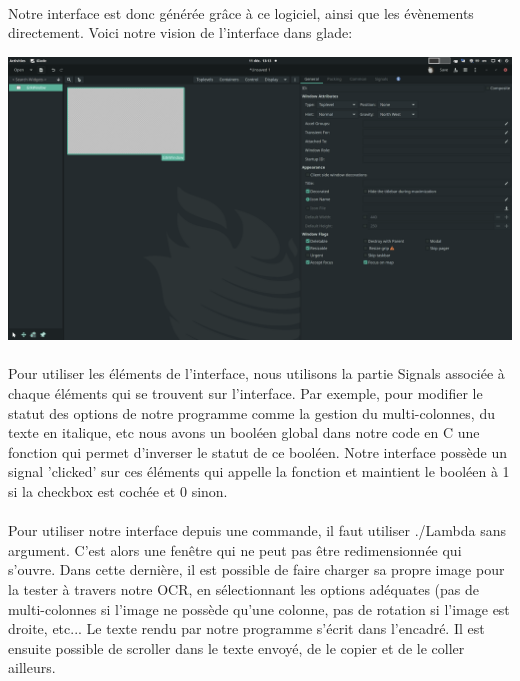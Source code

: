 \documentclass{article}
\begin{document}
\paragraph{}Notre interface est donc générée grâce à ce logiciel, ainsi que les évènements directement. Voici notre vision de l'interface dans glade: 

\begin{center}
	\includegraphics[scale=0.18]{glade_start_screen}
\end{center}

\paragraph{}Pour utiliser les éléments de l'interface, nous utilisons la partie Signals associée à chaque éléments qui se trouvent sur l'interface. Par exemple, pour modifier le statut des options de notre programme comme la gestion du multi-colonnes, du texte en italique, etc nous avons un booléen global dans notre code en C une fonction qui permet d'inverser le statut de ce booléen. Notre interface possède un signal 'clicked' sur ces éléments qui appelle la fonction et maintient le booléen à 1 si la checkbox est cochée et 0 sinon.

\newpage

\paragraph{}Pour utiliser notre interface depuis une commande, il faut utiliser ./Lambda sans argument. C'est alors une fenêtre qui ne peut pas être redimensionnée qui s'ouvre. Dans cette dernière, il est possible de faire charger sa propre image pour la tester à travers notre OCR, en sélectionnant les options adéquates (pas de multi-colonnes si l'image ne possède qu'une colonne, pas de rotation si l'image est droite, etc... Le texte rendu par notre programme s'écrit dans l'encadré. Il est ensuite possible de scroller dans le texte envoyé, de le copier et de le coller ailleurs.
\end{document}
